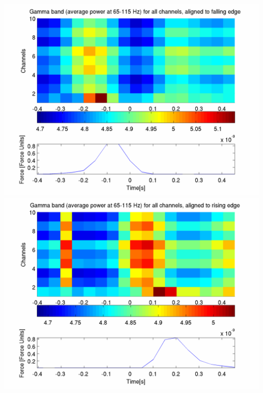 \documentclass[12pt]{article}
\begin{document}
\includegraphics[scale=0.2]{gamma_falling.png}
\includegraphics[scale=0.2]{gamma_rising.png}
\end{document}
